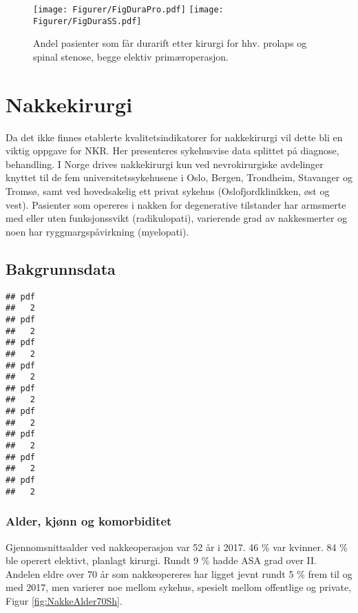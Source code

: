 \documentclass [norsk,a4paper,twoside]{article}\usepackage[]{graphicx}\usepackage[]{color}
\makeatletter
\newenvironment{kframe}{%
 \def\at@end@of@kframe{}%
 \ifinner\ifhmode%
  \def\at@end@of@kframe{\end{minipage}}%
  \begin{minipage}{\columnwidth}%
 \fi\fi%
 \def\FrameCommand##1{\hskip\@totalleftmargin \hskip-\fboxsep
 \colorbox{shadecolor}{##1}\hskip-\fboxsep
     \hskip-\linewidth \hskip-\@totalleftmargin \hskip\columnwidth}%
 \MakeFramed {\advance\hsize-\width
   \@totalleftmargin\z@ \linewidth\hsize
   \@setminipage}}%
 {\par\unskip\endMakeFramed%
 \at@end@of@kframe}
\newenvironment{knitrout}{}{} %
\makeatother
\begin{document}
\begin{figure}[ht]
\centering \texttt{[image: Figurer/FigDuraPro.pdf]}
\centering \texttt{[image: Figurer/FigDuraSS.pdf]}
\caption{\label{fig:Dura} Andel pasienter som får durarift etter kirurgi for hhv. prolaps og spinal stenose, begge elektiv primæroperasjon.}
\end{figure}









\clearpage

\section{Nakkekirurgi}
Da  det ikke finnes etablerte kvalitetsindikatorer for nakkekirurgi vil dette bli en
viktig oppgave for NKR.  Her presenteres sykehusvise data splittet på diagnose, behandling.
I Norge drives nakkekirurgi kun ved nevrokirurgiske avdelinger knyttet til de fem
universitetssykehusene i Oslo, Bergen, Trondheim, Stavanger og Tromsø, samt ved
hovedsakelig ett privat sykehus (Oslofjordklinikken, øst og vest).
Pasienter som opereres i nakken for degenerative tilstander har armsmerte med eller uten funksjonssvikt (radikulopati), varierende grad av nakkesmerter og noen har ryggmargspåvirkning (myelopati). 



\subsection{Bakgrunnsdata}

\begin{knitrout}
\color{fgcolor}\begin{kframe}
\begin{verbatim}
## pdf 
##   2
## pdf 
##   2
## pdf 
##   2
## pdf 
##   2
## pdf 
##   2
## pdf 
##   2
## pdf 
##   2
## pdf 
##   2
## pdf 
##   2
\end{verbatim}
\end{kframe}
\end{knitrout}

\subsubsection{Alder, kjønn og komorbiditet}
Gjennomsnittsalder ved nakkeoperasjon var 52 år i 2017. 46 \% var kvinner. 84 \% ble operert elektivt, planlagt kirurgi. Rundt  9 \% hadde ASA grad over II. Andelen eldre over 70 år som nakkeopereres har ligget jevnt rundt 5 \% frem til og med 2017, men varierer noe mellom sykehus, spesielt mellom offentlige og private, Figur \ref{fig:NakkeAlder70Sh}.
\end{document}
